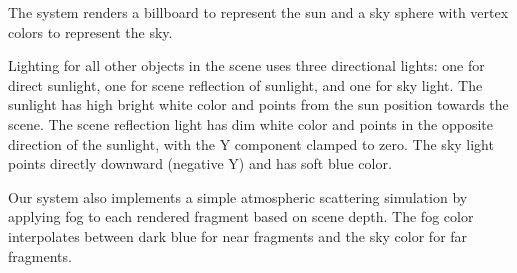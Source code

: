 The system renders a billboard to represent the sun and a sky sphere with vertex colors to represent the sky.

Lighting for all other objects in the scene uses three directional lights: one for direct sunlight, one for scene reflection of sunlight, and one for sky light.
The sunlight has high bright white color and points from the sun position towards the scene.
The scene reflection light has dim white color and points in the opposite direction of the sunlight, with the Y component clamped to zero.
The sky light points directly downward (negative Y) and has soft blue color.

Our system also implements a simple atmospheric scattering simulation by applying fog to each rendered fragment based on scene depth.
The fog color interpolates between dark blue for near fragments and the sky color for far fragments.
